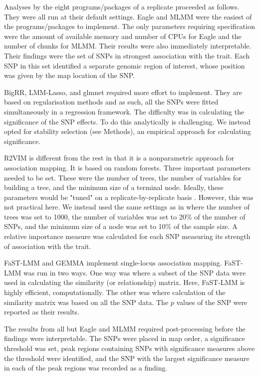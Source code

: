 \documentclass{article}
\begin{document}
 Analyses by the eight programs/packages of a replicate proceeded as follows. They were all run at their default settings. 
 Eagle and MLMM were the easiest of the programs/packages to implement. 
 The only parameters requiring specification were the amount of available memory and number of CPUs for 
 Eagle and the number of chunks for MLMM. 
 Their results were also immediately 
 interpretable. Their findings were the set of SNPs in strongest association with the trait. Each 
SNP in this set identified a separate genomic region of interest, whose position was given by the map location of the SNP.  

BigRR, LMM-Lasso, and glmnet required more effort to implement. They are based on regularisation methods and as such, all the SNPs were fitted simultaneously in a regression 
framework. The difficulty was in calculating the significance of the SNP effects. To do this analytically is challenging. We instead opted for stability selection (see Methods),  
an empirical approach for calculating significance. 

R2VIM is different from the rest in that it is a nonparametric approach for association mapping. It is based on random forests. Three important parameters needed to be  set. 
These were the number of trees, the number of variables for building a tree, and the minimum size of a terminal node. Ideally, these parameters would be "tuned" on a replicate-by-replicate 
basis \citep{boulesteix2012overview}. However, this was not practical here. We instead used the same settings as in \citep{szymczak2016r2vim} where 
the number of trees was set to 1000, the number of variables was set to 20\% of the number of SNPs, and 
  the minimum size of a node was set to 10\% of the sample size.
A relative importance measure was calculated 
for each SNP measuring its strength of association with the trait.

FaST-LMM and GEMMA implement single-locus association mapping. FaST-LMM was run in two ways. One way was where a subset of the SNP data were used in calculating the similarity (or relationship) matrix. Here, FaST-LMM is highly efficient, computationally. The other was where calculation of the similarity matrix was based on all the SNP data. The $p$ values of the SNP were reported as their results. 


The results from all but Eagle and MLMM required post-processing before the findings were interpretable.  The SNPs were placed in map order, 
a significance threshold was set, peak regions containing SNPs with significance measures above the threshold were identified, and the SNP with the largest 
significance measure in each of the peak regions was recorded as a finding. 
\end{document}
